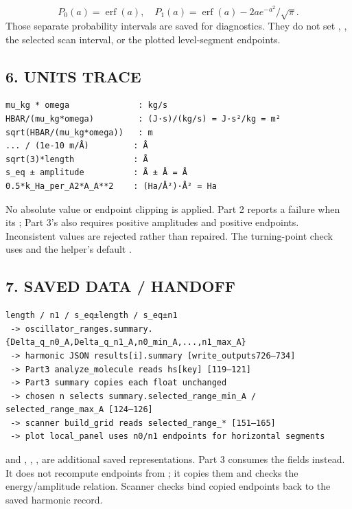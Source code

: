 \documentclass[10pt,a4paper]{article}
\begin{document}
\[
P_0(a)=\operatorname{erf}(a),\quad
P_1(a)=\operatorname{erf}(a)-2ae^{-a^2}/\sqrt\pi.
\]
Those separate probability intervals are saved for diagnostics. They do not set , , the selected scan interval, or the plotted level-segment endpoints.

\subsection{6. UNITS TRACE}
\begin{Verbatim}
mu_kg * omega              : kg/s
HBAR/(mu_kg*omega)         : (J·s)/(kg/s) = J·s²/kg = m²
sqrt(HBAR/(mu_kg*omega))   : m
... / (1e-10 m/Å)         : Å
sqrt(3)*length            : Å
s_eq ± amplitude          : Å ± Å = Å
0.5*k_Ha_per_A2*A_A**2    : (Ha/Å²)·Å² = Ha
\end{Verbatim}
No absolute value or endpoint clipping is applied. Part 2 reports a failure when its ; Part 3's  also requires positive amplitudes and positive endpoints. Inconsistent values are rejected rather than repaired. The turning-point check uses  and the  helper's default .

\subsection{7. SAVED DATA / HANDOFF}
\begin{Verbatim}
length / n1 / s_eq±length / s_eq±n1
 -> oscillator_ranges.summary.{Delta_q_n0_A,Delta_q_n1_A,n0_min_A,...,n1_max_A}
 -> harmonic JSON results[i].summary [write_outputs726–734]
 -> Part3 analyze_molecule reads hs[key] [119–121]
 -> Part3 summary copies each float unchanged
 -> chosen n selects summary.selected_range_min_A / selected_range_max_A [124–126]
 -> scanner build_grid reads selected_range_* [151–165]
 -> plot local_panel uses n0/n1 endpoints for horizontal segments
\end{Verbatim}
 and , , ,  are additional saved representations. Part 3 consumes the  fields instead. It does not recompute endpoints from ; it copies them and checks the energy/amplitude relation. Scanner checks bind copied endpoints back to the saved harmonic record.
\end{document}
